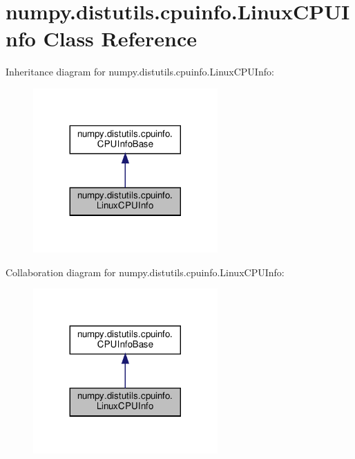 \hypertarget{classnumpy_1_1distutils_1_1cpuinfo_1_1LinuxCPUInfo}{}\section{numpy.\+distutils.\+cpuinfo.\+Linux\+C\+P\+U\+Info Class Reference}
\label{classnumpy_1_1distutils_1_1cpuinfo_1_1LinuxCPUInfo}


Inheritance diagram for numpy.\+distutils.\+cpuinfo.\+Linux\+C\+P\+U\+Info\+:
\nopagebreak
\begin{figure}[H]
\begin{center}
\leavevmode
\includegraphics[width=200pt]{classnumpy_1_1distutils_1_1cpuinfo_1_1LinuxCPUInfo__inherit__graph}
\end{center}
\end{figure}


Collaboration diagram for numpy.\+distutils.\+cpuinfo.\+Linux\+C\+P\+U\+Info\+:
\nopagebreak
\begin{figure}[H]
\begin{center}
\leavevmode
\includegraphics[width=200pt]{classnumpy_1_1distutils_1_1cpuinfo_1_1LinuxCPUInfo__coll__graph}
\end{center}
\end{figure}
